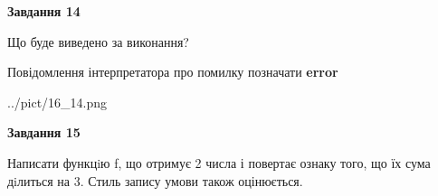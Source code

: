 \documentclass[11pt, ukrainian]{article}
\begin{document}
{\begin {large}
{\begin {center}\textbf{Завдання 14}\end {center}}\par
Що буде виведено за виконання? \par
Повідомлення інтерпретатора про помилку позначати \textbf{error}

\begin{center}
	{../pict/16_14.png}
\end{center}
\newpage

{\begin {center}\textbf{Завдання 15}\end {center}}\par

Написати функцiю f, що отримує 2 числа і повертає ознаку того, що їх сума дiлиться на 3. Стиль запису умови також оцінюється.\par
\newpage

\end {large}}
\end{document}

